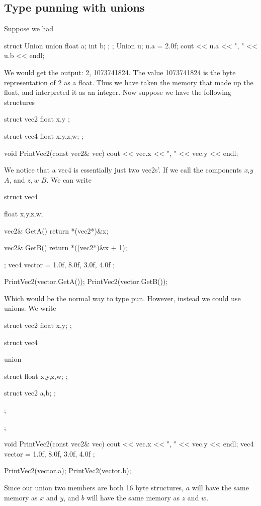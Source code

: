 \documentclass{report}
\begin{document}
    \subsection{Type punning with unions}
    \bigbreak \noindent 
    Suppose we had 
    \bigbreak \noindent 
    \begin{cppcode}
        struct Union {
            union {
                float a;
                int b;
            };
        };
        Union u;
        u.a = 2.0f;
        cout << u.a << ", " << u.b << endl;
    \end{cppcode}
    \bigbreak \noindent 
    We would get the output: 2, 1073741824. The value 1073741824 is the byte representation of 2 as a float. Thus we have taken the memory that made up the float, and interpreted it as an integer.
    \bigbreak \noindent 
    Now suppose we have the following structures
    \bigbreak \noindent 
    \begin{cppcode}
        struct vec2 {
            float x,y
        };
        
        struct vec4 {
            float x,y,z,w;
        };

        void PrintVec2(const vec2& vec) {
            cout << vec.x << ", " << vec.y << endl;
        }
    \end{cppcode}
    \pagebreak \bigbreak \noindent 
    We notice that a vec4 is essentially just two vec2s'. If we call the components \textit{x,y} $A$, and $z,w$ $B$. We can write 
    \bigbreak \noindent 
    \begin{cppcode}
        struct vec4 {
            float x,y,z,w;

            vec2& GetA() {
                return *(vec2*)&x;
            }

            vec2& GetB() {
                return *((vec2*)&x  + 1);
            }
        };
        vec4 vector = { 1.0f, 8.0f, 3.0f, 4.0f };

        PrintVec2(vector.GetA());
        PrintVec2(vector.GetB());
    \end{cppcode}
    \bigbreak \noindent 
    Which would be the normal way to type pun. However, instead we could use unions. We write
    \bigbreak \noindent
    \begin{cppcode}
        struct vec2 {
            float x,y;
        };

        struct vec4 {

            union {
                struct {
                    float x,y,z,w;
                };

                struct {
                    vec2 a,b;
                };
            };
        };

        void PrintVec2(const vec2& vec) {
            cout << vec.x << ", " << vec.y << endl;
        }
        vec4 vector = { 1.0f, 8.0f, 3.0f, 4.0f };

        PrintVec2(vector.a);
        PrintVec2(vector.b);
    \end{cppcode}
    \bigbreak \noindent 
    Since our union two members are both 16 byte structures, $a$ will have the same memory as $x$ and $y$, and $b$ will have the same memory as $z$ and $w$.
\end{document}
